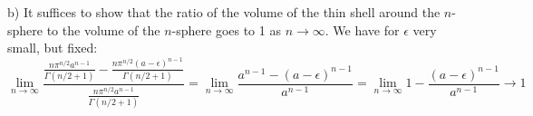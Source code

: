 \documentclass[12pt]{article}
\theoremstyle{plain}
\theoremstyle{definition}
\begin{document}
\begin{enumerate}
b) It suffices to show that the ratio of the volume of the thin shell around the $n$-sphere to the volume of the $n$-sphere goes to 1 as $n \rightarrow \infty$. We have for $\epsilon$ very small, but fixed:
$$ \lim_{n \rightarrow \infty} \frac{\frac{n \pi^{n/2} a^{n-1} }{\Gamma(n/2 +1)} -  \frac{n \pi^{n/2} (a- \epsilon)^{n-1} }{\Gamma(n/2 +1)}}{\frac{n \pi^{n/2} a^{n-1} }{\Gamma(n/2 +1)}}
=   \lim_{n \rightarrow \infty} \frac{a^{n-1} - (a-\epsilon)^{n-1}}{a^{n-1}}
= \lim_{n \rightarrow \infty} 1 - \frac{(a-\epsilon)^{n-1}}{a^{n-1} } \rightarrow 1 $$

















\end{enumerate}
\end{document}
